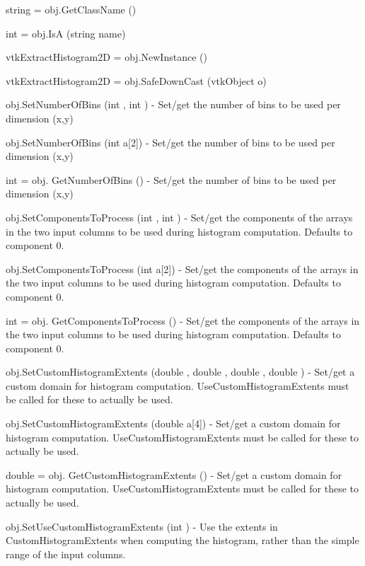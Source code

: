 \begin{DoxyItemize}
\item {\ttfamily string = obj.\-Get\-Class\-Name ()}  
\item {\ttfamily int = obj.\-Is\-A (string name)}  
\item {\ttfamily vtk\-Extract\-Histogram2\-D = obj.\-New\-Instance ()}  
\item {\ttfamily vtk\-Extract\-Histogram2\-D = obj.\-Safe\-Down\-Cast (vtk\-Object o)}  
\item {\ttfamily obj.\-Set\-Number\-Of\-Bins (int , int )} -\/ Set/get the number of bins to be used per dimension (x,y)  
\item {\ttfamily obj.\-Set\-Number\-Of\-Bins (int a\mbox{[}2\mbox{]})} -\/ Set/get the number of bins to be used per dimension (x,y)  
\item {\ttfamily int = obj. Get\-Number\-Of\-Bins ()} -\/ Set/get the number of bins to be used per dimension (x,y)  
\item {\ttfamily obj.\-Set\-Components\-To\-Process (int , int )} -\/ Set/get the components of the arrays in the two input columns to be used during histogram computation. Defaults to component 0.  
\item {\ttfamily obj.\-Set\-Components\-To\-Process (int a\mbox{[}2\mbox{]})} -\/ Set/get the components of the arrays in the two input columns to be used during histogram computation. Defaults to component 0.  
\item {\ttfamily int = obj. Get\-Components\-To\-Process ()} -\/ Set/get the components of the arrays in the two input columns to be used during histogram computation. Defaults to component 0.  
\item {\ttfamily obj.\-Set\-Custom\-Histogram\-Extents (double , double , double , double )} -\/ Set/get a custom domain for histogram computation. Use\-Custom\-Histogram\-Extents must be called for these to actually be used.  
\item {\ttfamily obj.\-Set\-Custom\-Histogram\-Extents (double a\mbox{[}4\mbox{]})} -\/ Set/get a custom domain for histogram computation. Use\-Custom\-Histogram\-Extents must be called for these to actually be used.  
\item {\ttfamily double = obj. Get\-Custom\-Histogram\-Extents ()} -\/ Set/get a custom domain for histogram computation. Use\-Custom\-Histogram\-Extents must be called for these to actually be used.  
\item {\ttfamily obj.\-Set\-Use\-Custom\-Histogram\-Extents (int )} -\/ Use the extents in Custom\-Histogram\-Extents when computing the histogram, rather than the simple range of the input columns.  

\end{DoxyItemize}
